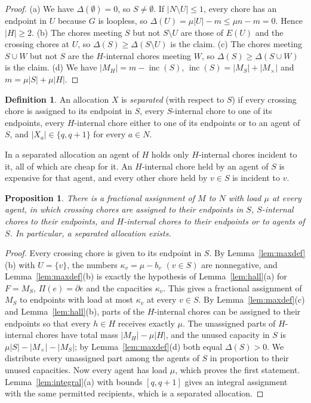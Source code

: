 \documentclass{amsart}
\numberwithin{equation}{section}
\newtheorem{proposition}[theorem]{Proposition}
\theoremstyle{definition}
\newtheorem{definition}[theorem]{Definition}
\theoremstyle{remark}
\newcommand{\inc}{\operatorname{inc}}
\newcommand{\bd}{\partial}
\begin{document}
\begin{proof}
(a) We have $\Delta(\emptyset)=0$, so $S\ne\emptyset$. If $|N\setminus U|\le1$, every chore has an endpoint in $U$ because $G$ is loopless, so $\Delta(U)=\mu|U|-m\le\mu n-m=0$. Hence $|H|\ge2$.
(b) The chores meeting $S$ but not $S\setminus U$ are those of $E(U)$ and the crossing chores at $U$, so $\Delta(S)\ge\Delta(S\setminus U)$ is the claim.
(c) The chores meeting $S\cup W$ but not $S$ are the $H$-internal chores meeting $W$, so $\Delta(S)\ge\Delta(S\cup W)$ is the claim.
(d) We have $|M_H|=m-\inc(S)$, $\inc(S)=|M_S|+|M_\times|$ and $m=\mu|S|+\mu|H|$.
\end{proof}

\begin{definition}\label{def:separated}
An allocation $X$ is \emph{separated} (with respect to $S$) if every crossing chore is assigned to its endpoint in $S$, every $S$-internal chore to one of its endpoints, every $H$-internal chore either to one of its endpoints or to an agent of $S$, and $|X_a|\in\{q,q+1\}$ for every $a\in N$.
\end{definition}

In a separated allocation an agent of $H$ holds only $H$-internal chores incident to it, all of which are cheap for it. An $H$-internal chore held by an agent of $S$ is expensive for that agent, and every other chore held by $v\in S$ is incident to $v$.

\begin{proposition}\label{prop:separated}
There is a fractional assignment of $M$ to $N$ with load $\mu$ at every agent, in which crossing chores are assigned to their endpoints in $S$, $S$-internal chores to their endpoints, and $H$-internal chores to their endpoints or to agents of $S$. In particular, a separated allocation exists.
\end{proposition}

\begin{proof}
Every crossing chore is given to its endpoint in $S$. By Lemma~\ref{lem:maxdef}(b) with $U=\{v\}$, the numbers $\kappa_v=\mu-b_v$ $(v\in S)$ are nonnegative, and Lemma~\ref{lem:maxdef}(b) is exactly the hypothesis of Lemma~\ref{lem:hall}(a) for $F=M_S$, $\Pi(e)=\bd e$ and the capacities $\kappa_v$. This gives a fractional assignment of $M_S$ to endpoints with load at most $\kappa_v$ at every $v\in S$. By Lemma~\ref{lem:maxdef}(c) and Lemma~\ref{lem:hall}(b), parts of the $H$-internal chores can be assigned to their endpoints so that every $h\in H$ receives exactly $\mu$. The unassigned parts of $H$-internal chores have total mass $|M_H|-\mu|H|$, and the unused capacity in $S$ is $\mu|S|-|M_\times|-|M_S|$; by Lemma~\ref{lem:maxdef}(d) both equal $\Delta(S)>0$. We distribute every unassigned part among the agents of $S$ in proportion to their unused capacities. Now every agent has load $\mu$, which proves the first statement. Lemma~\ref{lem:integral}(a) with bounds $[q,q+1]$ gives an integral assignment with the same permitted recipients, which is a separated allocation.
\end{proof}
\end{document}
